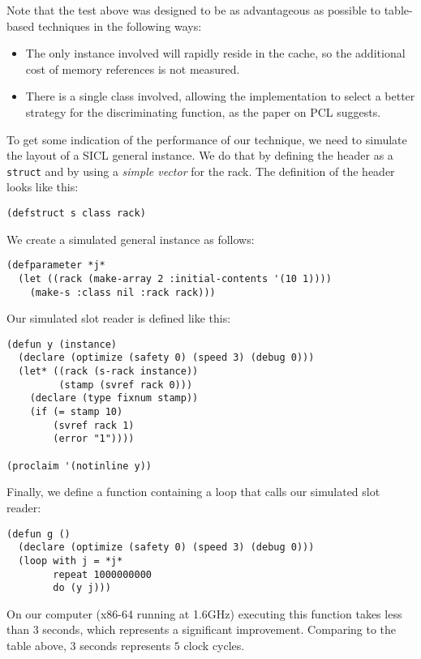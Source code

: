 {Note that the test above was designed to be as advantageous as
possible to table-based techniques in the following ways:

\begin{itemize}
\item The only instance involved will rapidly reside in the cache, so
  the additional cost of memory references is not measured.
\item There is a single class involved, allowing the implementation to
  select a better strategy for the discriminating function, as the
  paper on PCL suggests. 
\end{itemize}

To get some indication of the performance of our technique, we need to
simulate the layout of a SICL general instance.  We do that by
defining the header as a \cl{} \texttt{struct} and by using a
\emph{simple vector} for the rack.  The definition of the header looks
like this:

{\small\begin{verbatim}
(defstruct s class rack)
\end{verbatim}}

We create a simulated general instance as follows:

{\small\begin{verbatim}
(defparameter *j* 
  (let ((rack (make-array 2 :initial-contents '(10 1))))
    (make-s :class nil :rack rack)))
\end{verbatim}}

Our simulated slot reader is defined like this:

{\small\begin{verbatim}
(defun y (instance)
  (declare (optimize (safety 0) (speed 3) (debug 0)))
  (let* ((rack (s-rack instance))
         (stamp (svref rack 0)))
    (declare (type fixnum stamp))
    (if (= stamp 10)
        (svref rack 1)
        (error "1"))))

(proclaim '(notinline y))
\end{verbatim}}

Finally, we define a function containing a loop that calls our
simulated slot reader:

{\small\begin{verbatim}
(defun g ()
  (declare (optimize (safety 0) (speed 3) (debug 0)))
  (loop with j = *j*
        repeat 1000000000
        do (y j)))
\end{verbatim}}

On our computer (x86-64 running at 1.6GHz) executing this function
takes less than $3$ seconds, which represents a significant
improvement.  Comparing to the table above, $3$ seconds represents $5$
clock cycles. 

}
